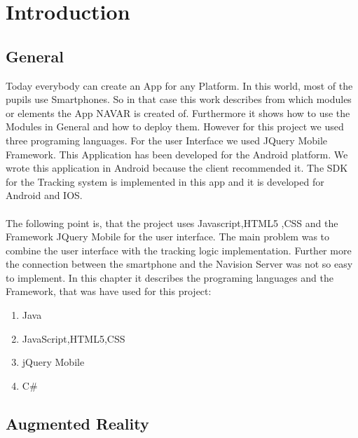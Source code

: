 \chapter{Introduction} \label{chapter:introduction} 
\section{General}
 Today everybody can create an App for any Platform. In this world, most of the pupils use Smartphones. So in that case this work describes from which modules or elements  the App NAVAR is created of.  Furthermore it shows how to use the Modules in General and how to deploy them. However for this project we used three programing languages. For the user Interface we used JQuery Mobile Framework. This Application has been developed for the Android platform.  We wrote this application in Android because the client recommended it. The SDK  for the Tracking system is implemented  in this app and it is developed for Android and IOS.   
 \\\\
 The following point is, that the project uses Javascript,HTML5 ,CSS  and the Framework JQuery Mobile for the user interface. The main problem was to combine the user interface with the tracking logic implementation. Further more the connection between the smartphone and the Navision Server was not so easy to implement.
 In this chapter it describes the programing languages and the Framework, that was have used for this project:
 \begin{enumerate}
 \item Java
 \item JavaScript,HTML5,CSS
 \item jQuery Mobile
 \item C\#
 \end{enumerate}
 \newpage
 \section{Augmented Reality}
